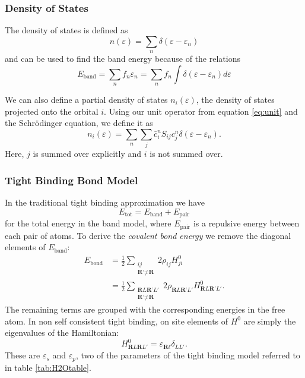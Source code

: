 \documentclass{article}
\begin{document}
\begin{multicols}{2}
\subsubsection{Density of States}
The density of states is defined as
\begin{equation}
	n(\varepsilon)=\sum_{n}\delta(\varepsilon-\varepsilon_{n})
\end{equation}
and can be used to find the band energy because of the relations
\begin{equation}
	E_{\text{band}} = \sum_{n}f_{n}\varepsilon_{n}=\sum_{n}f_{n}\int\delta(\varepsilon-\varepsilon_{n})d\varepsilon
\end{equation}

We can also define a partial density of states $n_{i}(\varepsilon)$, the density of states projected onto the orbital $i$. Using our unit operator from equation \ref{eq:unit} and the Schr\"odinger equation, we define it as
\begin{equation}
	n_{i}(\varepsilon)=\sum_{n}\sum_{j}\bar{c}^{n}_{i}S_{ij}c^{n}_{j}\delta(\varepsilon-\varepsilon_n).
\end{equation}
Here, $j$ is summed over explicitly and $i$ is not summed over.

\subsubsection{Tight Binding Bond Model}
\label{sec:TBBM}

In the traditional tight binding approximation we have
\begin{equation}
	E_{\text{tot}}=E_{\text{band}}+E_{\text{pair}}
\end{equation}
for the total energy in the band model, where $E_{\text{pair}}$ is a repulsive energy between each pair of atoms. To derive the \textit{covalent bond energy} \cite{sutton1993electronic,Sutton_1988} we remove the diagonal elements of $E_{\text{band}}$: 
\begin{equation}
	\begin{split}
		E_{\text{bond}}&=\frac{1}{2}\sum\limits_{\substack{ij \\ \textbf{R'}\neq\textbf{R}}}2\rho_{ij}H^0_{ji} \\
		&=\frac{1}{2}\sum\limits_{\substack{\textbf{R}L\textbf{R'}L' \\ \textbf{R'}\neq\textbf{R}}}2\rho_{\textbf{R}L\textbf{R'}L'}H^0_{\textbf{R}L\textbf{R'}L'}.
	\end{split}
\end{equation}
The remaining terms are grouped with the corresponding energies in the free atom. In non self consistent tight binding, on site elements of $H^{0}$ are simply the eigenvalues of the Hamiltonian:
\begin{equation}
	H^{0}_{\textbf{R}L\textbf{R}L'}=\varepsilon_{\textbf{R}\ell}\delta_{LL'}.
\end{equation}
These are $\varepsilon_{s}$ and $\varepsilon_{p}$, two of the parameters of the tight binding model referred to in table \ref{tab:H2Otable}. 


\end{multicols}
\end{document}
